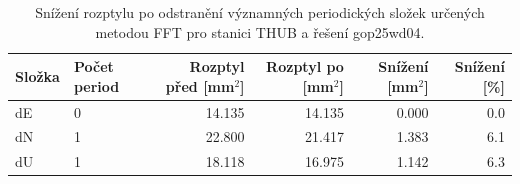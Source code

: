 \begin{table}[htbp]
\caption{Snížení rozptylu po odstranění významných periodických složek určených metodou FFT pro stanici THUB a řešení gop25wd04.}
\label{tab:gop25wd04_stcd_thub_detr_weighted_1seg_spectral_fft_variance_reduction}
\begin{tabular}{llrrrr}
\toprule
Složka & Počet period & Rozptyl před [mm$^2$] & Rozptyl po [mm$^2$] & Snížení [mm$^2$] & Snížení [\%] \\
\midrule
dE & 0 & 14.135 & 14.135 & 0.000 & 0.0 \\
dN & 1 & 22.800 & 21.417 & 1.383 & 6.1 \\
dU & 1 & 18.118 & 16.975 & 1.142 & 6.3 \\
\bottomrule
\end{tabular}
\end{table}

